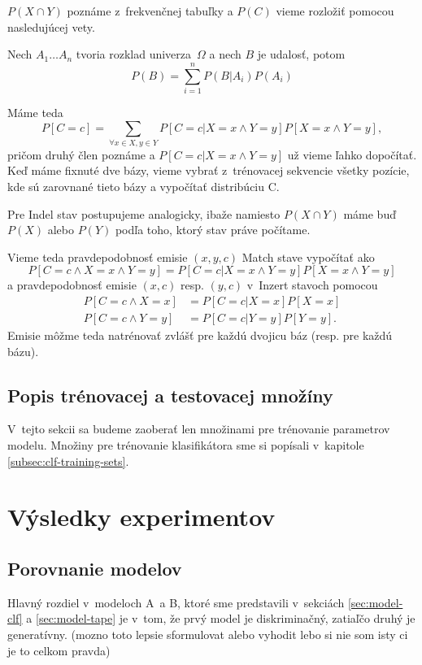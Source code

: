 $P(X \cap Y)$ poznáme z~frekvenčnej tabuľky a $P(C)$ vieme rozložiť pomocou nasledujúcej vety.

\begin{vt}
Nech $A_1\dots A_n$ tvoria rozklad univerza~$\Omega$ a nech $B$ je udalosť, potom
$$P(B) = \sum_{i=1}^n P(B|A_i)P(A_i)$$
\end{vt}

Máme teda
$$P\left[C=c\right] = \sum_{\forall x\in X, y \in Y} P\left[C=c | X=x \wedge Y=y\right] P\left[X=x \wedge Y=y\right],$$
pričom druhý člen poznáme a $P\left[C=c | X=x \wedge Y=y\right]$ už vieme ľahko dopočítať. Keď máme fixnuté dve bázy, vieme vybrať z~trénovacej sekvencie všetky pozície, kde sú zarovnané tieto bázy a vypočítať distribúciu C.

Pre Indel stav postupujeme analogicky, ibaže namiesto $P(X \cap Y)$ máme buď $P(X)$ alebo $P(Y)$ podľa toho, ktorý stav práve počítame.

Vieme teda pravdepodobnosť emisie $(x, y, c)$ Match stave vypočítať ako $$P\left[C=c \wedge X=x \wedge Y=y\right] = P\left[C=c | X=x \wedge Y=y\right] P\left[X=x \wedge Y=y\right]$$ a pravdepodobnosť emisie $(x, c)$ resp. $(y, c)$  v~Inzert stavoch pomocou
\begin{align*}
P\left[C=c \wedge X=x\right] &= P\left[C=c | X=x\right] P\left[X=x\right]\\
P\left[C=c \wedge Y=y\right] &= P\left[C=c | Y=y\right] P\left[Y=y\right].
\end{align*}
Emisie môžme teda natrénovať zvlášť pre každú dvojicu báz (resp. pre každú bázu).

\subsection{Popis trénovacej a testovacej množíny}

V~tejto sekcii sa budeme zaoberať len množinami pre trénovanie parametrov modelu. Množiny pre trénovanie klasifikátora sme si popísali v~kapitole \ref{subsec:clf-training-sets}.



\section{Výsledky experimentov}

\subsection{Porovnanie modelov}
\label{sec:cmp-model}
Hlavný rozdiel v~modeloch A~a B, ktoré sme predstavili v~sekciách \ref{sec:model-clf} a \ref{sec:model-tape} je v~tom, že prvý model je diskriminačný, zatiaľčo druhý je generatívny. (\todo mozno toto lepsie sformulovat alebo vyhodit lebo si nie som isty ci je to celkom pravda)

